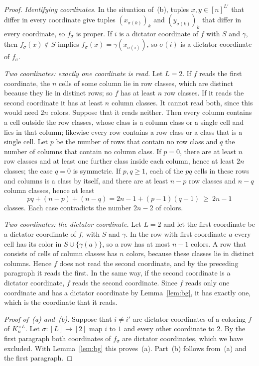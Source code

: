 \begin{proof}
\emph{Identifying coordinates.} In the situation of~(b), tuples $x,y\in[n]^{L'}$ that differ in every coordinate give tuples $(x_{\sigma(k)})_k$ and $(y_{\sigma(k)})_k$ that differ in every coordinate, so $f_\sigma$ is proper. If $i$ is a dictator coordinate of $f$ with $S$ and $\gamma$, then $f_\sigma(x)\notin S$ implies $f_\sigma(x)=\gamma(x_{\sigma(i)})$, so $\sigma(i)$ is a dictator coordinate of $f_\sigma$.

\emph{Two coordinates: exactly one coordinate is read.} Let $L=2$. If $f$ reads the first coordinate, the $n$ cells of some column lie in row classes, which are distinct because they lie in distinct rows; so $f$ has at least $n$ row classes. If it reads the second coordinate it has at least $n$ column classes. It cannot read both, since this would need $2n$ colors. Suppose that it reads neither. Then every column contains a cell outside the row classes, whose class is a column class or a single cell and lies in that column; likewise every row contains a row class or a class that is a single cell. Let $p$ be the number of rows that contain no row class and $q$ the number of columns that contain no column class. If $p=0$, there are at least $n$ row classes and at least one further class inside each column, hence at least $2n$ classes; the case $q=0$ is symmetric. If $p,q\ge1$, each of the $pq$ cells in these rows and columns is a class by itself, and there are at least $n-p$ row classes and $n-q$ column classes, hence at least
\[
 pq+(n-p)+(n-q)=2n-1+(p-1)(q-1)\ \ge\ 2n-1
\]
classes. Each case contradicts the number $2n-2$ of colors.

\emph{Two coordinates: the dictator coordinate.} Let $L=2$ and let the first coordinate be a dictator coordinate of $f$, with $S$ and $\gamma$. In the row with first coordinate $a$ every cell has its color in $S\cup\{\gamma(a)\}$, so a row has at most $n-1$ colors. A row that consists of cells of column classes has $n$ colors, because these classes lie in distinct columns. Hence $f$ does not read the second coordinate, and by the preceding paragraph it reads the first. In the same way, if the second coordinate is a dictator coordinate, $f$ reads the second coordinate. Since $f$ reads only one coordinate and has a dictator coordinate by Lemma~\ref{lem:bg}, it has exactly one, which is the coordinate that it reads.

\emph{Proof of~\textup{(a)} and~\textup{(b)}.} Suppose that $i\ne i'$ are dictator coordinates of a coloring $f$ of $K_n^{\times L}$. Let $\sigma:[L]\to[2]$ map $i$ to $1$ and every other coordinate to $2$. By the first paragraph both coordinates of $f_\sigma$ are dictator coordinates, which we have excluded. With Lemma~\ref{lem:bg} this proves~(a). Part~(b) follows from~(a) and the first paragraph.


\end{proof}
